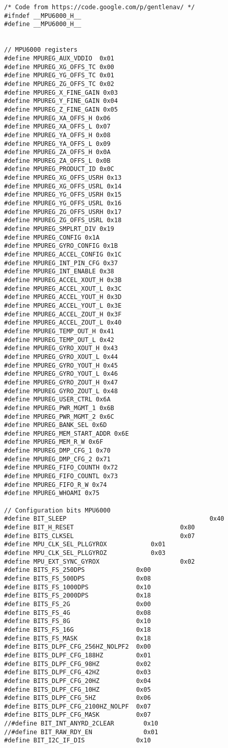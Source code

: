 \begin{lstlisting}[caption=MPU6000 Defines,label=Code3]
/* Code from https://code.google.com/p/gentlenav/ */
#ifndef __MPU6000_H__
#define __MPU6000_H__


// MPU6000 registers
#define MPUREG_AUX_VDDIO  0x01
#define MPUREG_XG_OFFS_TC 0x00
#define MPUREG_YG_OFFS_TC 0x01
#define MPUREG_ZG_OFFS_TC 0x02
#define MPUREG_X_FINE_GAIN 0x03
#define MPUREG_Y_FINE_GAIN 0x04
#define MPUREG_Z_FINE_GAIN 0x05
#define MPUREG_XA_OFFS_H 0x06
#define MPUREG_XA_OFFS_L 0x07
#define MPUREG_YA_OFFS_H 0x08
#define MPUREG_YA_OFFS_L 0x09
#define MPUREG_ZA_OFFS_H 0x0A
#define MPUREG_ZA_OFFS_L 0x0B
#define MPUREG_PRODUCT_ID 0x0C
#define MPUREG_XG_OFFS_USRH 0x13
#define MPUREG_XG_OFFS_USRL 0x14
#define MPUREG_YG_OFFS_USRH 0x15
#define MPUREG_YG_OFFS_USRL 0x16
#define MPUREG_ZG_OFFS_USRH 0x17
#define MPUREG_ZG_OFFS_USRL 0x18
#define MPUREG_SMPLRT_DIV 0x19
#define MPUREG_CONFIG 0x1A
#define MPUREG_GYRO_CONFIG 0x1B
#define MPUREG_ACCEL_CONFIG 0x1C
#define MPUREG_INT_PIN_CFG 0x37
#define MPUREG_INT_ENABLE 0x38
#define MPUREG_ACCEL_XOUT_H 0x3B
#define MPUREG_ACCEL_XOUT_L 0x3C
#define MPUREG_ACCEL_YOUT_H 0x3D
#define MPUREG_ACCEL_YOUT_L 0x3E
#define MPUREG_ACCEL_ZOUT_H 0x3F
#define MPUREG_ACCEL_ZOUT_L 0x40
#define MPUREG_TEMP_OUT_H 0x41
#define MPUREG_TEMP_OUT_L 0x42
#define MPUREG_GYRO_XOUT_H 0x43
#define MPUREG_GYRO_XOUT_L 0x44
#define MPUREG_GYRO_YOUT_H 0x45
#define MPUREG_GYRO_YOUT_L 0x46
#define MPUREG_GYRO_ZOUT_H 0x47
#define MPUREG_GYRO_ZOUT_L 0x48
#define MPUREG_USER_CTRL 0x6A
#define MPUREG_PWR_MGMT_1 0x6B
#define MPUREG_PWR_MGMT_2 0x6C
#define MPUREG_BANK_SEL 0x6D
#define MPUREG_MEM_START_ADDR 0x6E
#define MPUREG_MEM_R_W 0x6F
#define MPUREG_DMP_CFG_1 0x70
#define MPUREG_DMP_CFG_2 0x71
#define MPUREG_FIFO_COUNTH 0x72
#define MPUREG_FIFO_COUNTL 0x73
#define MPUREG_FIFO_R_W 0x74
#define MPUREG_WHOAMI 0x75

// Configuration bits MPU6000
#define BIT_SLEEP                                       0x40
#define BIT_H_RESET                             0x80
#define BITS_CLKSEL                             0x07
#define MPU_CLK_SEL_PLLGYROX            0x01
#define MPU_CLK_SEL_PLLGYROZ            0x03
#define MPU_EXT_SYNC_GYROX                      0x02
#define BITS_FS_250DPS              0x00
#define BITS_FS_500DPS              0x08
#define BITS_FS_1000DPS             0x10
#define BITS_FS_2000DPS             0x18
#define BITS_FS_2G                  0x00
#define BITS_FS_4G                  0x08
#define BITS_FS_8G                  0x10
#define BITS_FS_16G                 0x18
#define BITS_FS_MASK                0x18
#define BITS_DLPF_CFG_256HZ_NOLPF2  0x00
#define BITS_DLPF_CFG_188HZ         0x01
#define BITS_DLPF_CFG_98HZ          0x02
#define BITS_DLPF_CFG_42HZ          0x03
#define BITS_DLPF_CFG_20HZ          0x04
#define BITS_DLPF_CFG_10HZ          0x05
#define BITS_DLPF_CFG_5HZ           0x06
#define BITS_DLPF_CFG_2100HZ_NOLPF  0x07
#define BITS_DLPF_CFG_MASK          0x07
//#define BIT_INT_ANYRD_2CLEAR        0x10
//#define BIT_RAW_RDY_EN              0x01
#define BIT_I2C_IF_DIS              0x10


\end{lstlisting}
